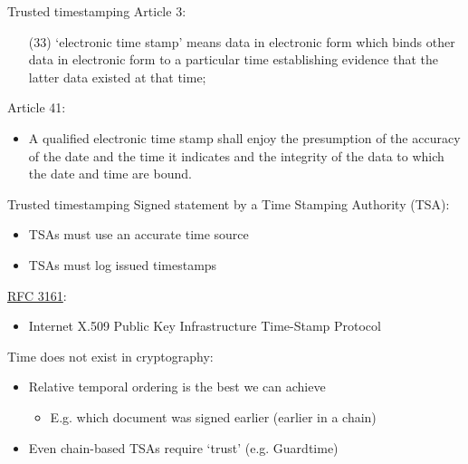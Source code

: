 \begin{frame}{Trusted timestamping}
  \pause
  Article 3:
  \begin{enumerate}
    \item[(33)] `electronic time stamp' means data in electronic form which binds other data in electronic form to a particular time establishing evidence that the latter data existed at that time;
  \end{enumerate}

  \pause
  Article 41:
  \begin{itemize}
    \setcounter{enumi}{1}
    \item A qualified electronic time stamp shall enjoy the presumption of the accuracy of the date and the time it indicates and the integrity of the data to which the date and time are bound.
  \end{itemize}
\end{frame}

\begin{frame}{Trusted timestamping}
  \pause
  Signed statement by a Time Stamping Authority (TSA):
  \begin{itemize}[<+(1)->]
    \item TSAs must use an accurate time source
    \item TSAs must log issued timestamps
  \end{itemize}

  \pause
  \href{https://datatracker.ietf.org/doc/html/rfc3161}{RFC 3161}:
  \begin{itemize}[<+(1)->]
    \item Internet X.509 Public Key Infrastructure Time-Stamp Protocol
  \end{itemize}

  \pause
  Time does not exist in cryptography:
  \begin{itemize}[<+(1)->]
    \item Relative temporal ordering is the best we can achieve
    \begin{itemize}
      \item E.g. which document was signed earlier (earlier in a chain)
    \end{itemize}
    \item Even chain-based TSAs require `trust' (e.g. Guardtime)
  \end{itemize}
\end{frame}

